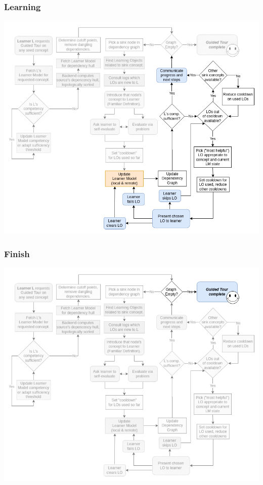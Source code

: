 \documentclass[aspectratio=169, usenames, dvipsnames]{beamer}
\begin{document}
\begin{frame}
\frametitle{Learning}
\begin{minipage}{0.7\textwidth}
\vspace*{-10px}
\includegraphics[height=0.9\textheight,keepaspectratio]{images/gt_algorithm_square_step3}
\end{minipage}%
\begin{minipage}{0.3\textwidth}
\end{minipage}%
\end{frame}

\begin{frame}
\frametitle{Finish}
\begin{minipage}{0.7\textwidth}
\vspace*{-10px}
\includegraphics[height=0.9\textheight,keepaspectratio]{images/gt_algorithm_square_step4}
\end{minipage}%
\begin{minipage}{0.3\textwidth}
\end{minipage}%
\end{frame}
\end{document}
